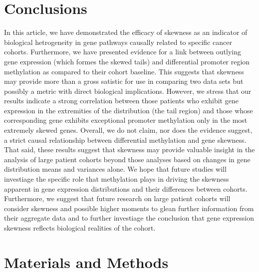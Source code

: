 \documentclass[11pt]{article}
\begin{document}
{\color{red} 
\section*{Conclusions}

In this article, we have demonstrated the efficacy of skewness as an indicator of biological hetrogeneity in gene pathways causally related to specific cancer cohorts. Furthermore, we have presented evidence for a link between outlying gene expression (which formes the skewed tails) and differential promoter region methylation as compared to their cohort baseline. This suggests that skewness may provide more than a gross satistic for use in comparing two data sets but possibly a metric with direct biological implications. However, we stress that our results indicate a strong correlation between those patients who exhibit gene expression in the extremities of the distribution (the tail region) and those whose corresponding gene exhibits exceptional promoter methylation only in the most extremely skewed genes. Overall, we do not claim, nor does the evidence suggest, a strict causal relationship between differential methylation and gene skewness. That said, these results suggest that skewness may provide valuable insight in the analysis of large patient cohorts beyond those analyses based on changes in gene distribution means and variances alone. We hope that future studies will investiage the specific role that methylation plays in driving the skewness apparent in gene expression distributions and their differences between cohorts. Furthermore, we suggest that future research on large patient cohorts will consider skewness and possible higher moments to glean further information from their aggregate data and to further investiage the conclusion that gene expression skewness reflects biological realities of the cohort. 
}

\section*{Materials and Methods}
\end{document}
